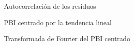 \documentclass[a4paper]{article}
\begin{document}
\begin{figure}[H]
	\centering
	\caption{Autocorrelación de los residuos}
	\label{fig:cpi_cntr_acf}
\end{figure}

\begin{figure}[H]
	\centering
	\caption{PBI centrado por la tendencia lineal} 	
	\label{fig:PBI_cntr}
\end{figure}

\begin{figure}[H]
	\centering
	\caption{Transformada de Fourier del PBI centrado} 	
	\label{fig:PBI_cntr_fft}
\end{figure}
\end{document}
